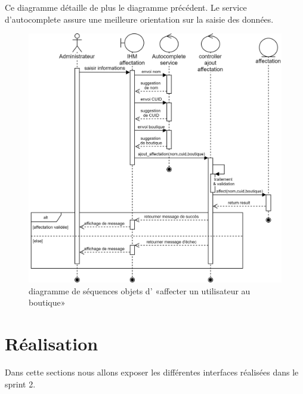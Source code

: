 Ce diagramme détaille de plus le diagramme précédent. Le service d'autocomplete assure une meilleure orientation sur la saisie des données.
\begin{figure}[H]
	\centering
	\includegraphics[width=0.65\linewidth]{"img/conception/sequences/sprint 2/affectation-obj"}
	\caption[diagramme de séquences objets d’ «affecter un utilisateur au boutique»]{diagramme de séquences objets d’ «affecter un utilisateur au boutique»}
	\label{fig:affectation-obj}
\end{figure}



\section{Réalisation}
Dans cette sections nous allons exposer les différentes interfaces réalisées dans le sprint 2. 
